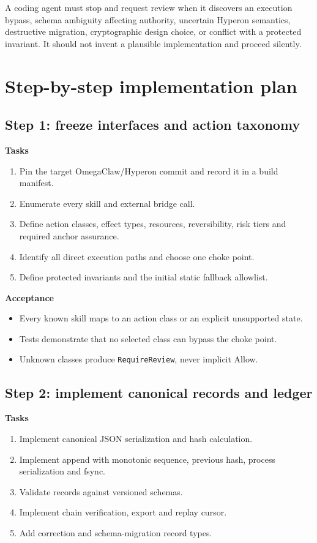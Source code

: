\documentclass[11pt,oneside]{report}
\begin{document}
\begin{cautionbox}
A coding agent must stop and request review when it discovers an execution bypass, schema ambiguity affecting authority, uncertain Hyperon semantics, destructive migration, cryptographic design choice, or conflict with a protected invariant. It should not invent a plausible implementation and proceed silently.
\end{cautionbox}

\chapter{Step-by-step implementation plan}

\section{Step 1: freeze interfaces and action taxonomy}

\textbf{Tasks}
\begin{enumerate}
  \item Pin the target OmegaClaw/Hyperon commit and record it in a build manifest.
  \item Enumerate every skill and external bridge call.
  \item Define action classes, effect types, resources, reversibility, risk tiers and required anchor assurance.
  \item Identify all direct execution paths and choose one choke point.
  \item Define protected invariants and the initial static fallback allowlist.
\end{enumerate}

\textbf{Acceptance}
\begin{itemize}
  \item Every known skill maps to an action class or an explicit unsupported state.
  \item Tests demonstrate that no selected class can bypass the choke point.
  \item Unknown classes produce \texttt{RequireReview}, never implicit Allow.
\end{itemize}

\section{Step 2: implement canonical records and ledger}

\textbf{Tasks}
\begin{enumerate}
  \item Implement canonical JSON serialization and hash calculation.
  \item Implement append with monotonic sequence, previous hash, process serialization and fsync.
  \item Validate records against versioned schemas.
  \item Implement chain verification, export and replay cursor.
  \item Add correction and schema-migration record types.
\end{enumerate}
\end{document}
